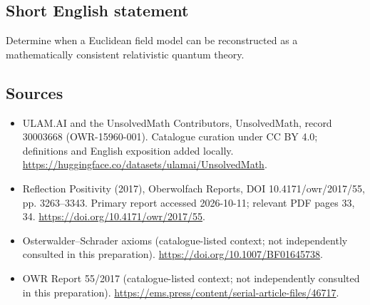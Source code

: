 \documentclass[11pt]{article}
\begin{document}
\subsection{Short English statement}
Determine when a Euclidean field model can be reconstructed as a mathematically consistent relativistic quantum theory.
\subsection{Sources}
\begin{itemize}
\item[\hypertarget{source:30003668:1}{S1}] ULAM.AI and the UnsolvedMath Contributors, UnsolvedMath, record 30003668 (OWR-15960-001). Catalogue curation under CC BY 4.0; definitions and English exposition added locally.
\url{https://huggingface.co/datasets/ulamai/UnsolvedMath}.
\item[\hypertarget{source:30003668:2}{S2}] Reflection Positivity (2017), Oberwolfach Reports, DOI 10.4171/owr/2017/55, pp. 3263--3343. Primary report accessed 2026-10-11; relevant PDF pages 33, 34.
\url{https://doi.org/10.4171/owr/2017/55}.
\item[\hypertarget{source:30003668:3}{S3}] Osterwalder--Schrader axioms (catalogue-listed context; not independently consulted in this preparation).
\url{https://doi.org/10.1007/BF01645738}.
\item[\hypertarget{source:30003668:4}{S4}] OWR Report 55/2017 (catalogue-listed context; not independently consulted in this preparation).
\url{https://ems.press/content/serial-article-files/46717}.
\end{itemize}
\label{end:30003668}
\end{document}
